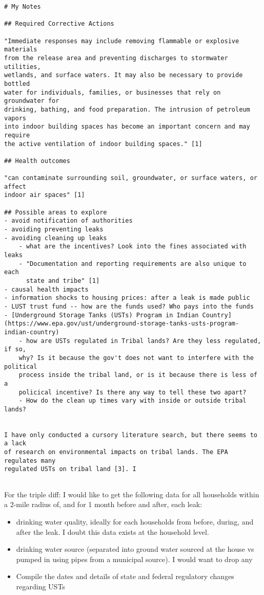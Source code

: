 \documentclass[12pt]{article}
\begin{document}
\newpage
\begin{verbatim}
# My Notes

## Required Corrective Actions

"Immediate responses may include removing flammable or explosive materials
from the release area and preventing discharges to stormwater utilities,
wetlands, and surface waters. It may also be necessary to provide bottled
water for individuals, families, or businesses that rely on groundwater for
drinking, bathing, and food preparation. The intrusion of petroleum vapors
into indoor building spaces has become an important concern and may require
the active ventilation of indoor building spaces." [1]

## Health outcomes

"can contaminate surrounding soil, groundwater, or surface waters, or affect
indoor air spaces" [1]

## Possible areas to explore
- avoid notification of authorities
- avoiding preventing leaks
- avoiding cleaning up leaks
    - what are the incentives? Look into the fines associated with leaks
    - "Documentation and reporting requirements are also unique to each 
      state and tribe" [1]
- causal health impacts
- information shocks to housing prices: after a leak is made public
- LUST trust fund -- how are the funds used? Who pays into the funds
- [Underground Storage Tanks (USTs) Program in Indian Country](https://www.epa.gov/ust/underground-storage-tanks-usts-program-indian-country) 
    - how are USTs regulated in Tribal lands? Are they less regulated, if so,
    why? Is it because the gov't does not want to interfere with the political
    process inside the tribal land, or is it because there is less of a
    policical incentive? Is there any way to tell these two apart?
    - How do the clean up times vary with inside or outside tribal lands?


I have only conducted a cursory literature search, but there seems to a lack
of research on environmental impacts on tribal lands. The EPA regulates many
regulated USTs on tribal land [3]. I


\end{verbatim}


For the triple diff: I would like to get the following data for all households within a 2-mile radius of, and for 1 month before and after, each leak:

\begin{itemize}
    \item drinking water quality, ideally for each households from before, during, and after the leak. I doubt this data exists at the household level.
    \item drinking water source (separated into ground water sourced at the house vs pumped in using pipes from a municipal source). I would want to drop any
    \item Compile the dates and details of state and federal regulatory changes regarding USTs
\end{itemize}
\end{document}
